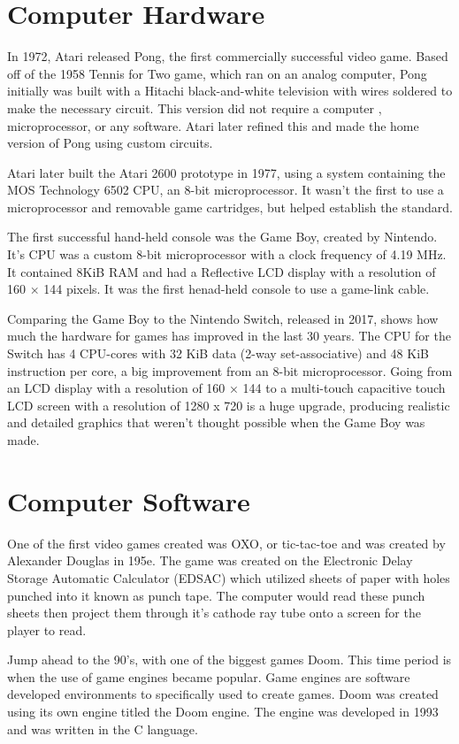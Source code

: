 \documentclass[letterpaper, 10 pt, conference]{IEEEconf}
\begin{document}
\section{Computer Hardware}
In 1972, Atari released Pong,  the first commercially successful video game. 
Based off of the 1958 Tennis for Two game, which ran on an analog computer, 
Pong initially was built  with a Hitachi black-and-white television with wires
soldered to make the necessary circuit. This version did not require a computer
, microprocessor, or any software. Atari later refined this and made the home 
version of Pong using custom circuits.

Atari later built the Atari 2600 prototype in 1977, using a system containing
the MOS Technology 6502 CPU, an 8-bit microprocessor. It wasn’t the first to 
use a microprocessor and removable game cartridges, but helped establish the 
standard.

The first successful hand-held console was the Game Boy, created by Nintendo. 
It’s CPU was a custom 8-bit microprocessor with a clock frequency of 4.19 MHz.
It contained 8KiB RAM and had a Reflective LCD display with a resolution of 
160 × 144 pixels. It was the first henad-held console to use a game-link cable.

Comparing the Game Boy to the Nintendo Switch, released in 2017, shows how much
the hardware for games has improved in the last 30 years. The CPU for the Switch 
has 4 CPU-cores with 32 KiB data (2-way set-associative) and 48 KiB instruction 
per core, a big improvement from an 8-bit microprocessor. Going from an LCD display
with a resolution of 160 × 144 to a multi-touch capacitive touch LCD screen with
a resolution of 1280 x 720 is a huge upgrade, producing realistic and detailed graphics
that weren’t thought possible when the Game Boy was made.
\section{Computer Software}
One of the first video games created was OXO, or tic-tac-toe and was created by Alexander 
Douglas in 195e. The game was created on the Electronic Delay Storage Automatic Calculator 
(EDSAC) which utilized sheets of paper with holes punched into it known as punch tape. The 
computer would read these punch sheets then project them through it’s cathode ray tube onto 
a screen for the player to read.

Jump ahead to the 90’s, with one of the biggest games Doom. This time period is when the use of 
game engines became popular. Game engines are software developed environments to specifically used 
to create games. Doom was created using its own engine titled the Doom engine. The engine was developed 
in 1993 and was written in the C language. 
\end{document}
